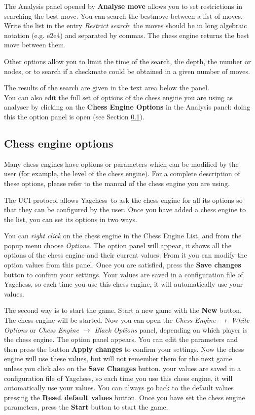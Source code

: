 \documentclass[a4paper]{article}
\newcommand{\nameprog}{Yagchess}
\begin{document}
The Analysis panel opened by \textbf{Analyse move} allows you to set restrictions in searching the best move. You can search the bestmove between a list of moves. Write the list
in the entry \textit{Restrict search}: the moves should be in long algebraic notation (e.g. e2e4) and separated by commas. The chess engine returns the best move
between them.

Other options allow you to limit the time of the search, the depth, the number or nodes, or to search if a checkmate could be obtained in a given number of moves.

The results of the search are given in the text area below the panel.\\

You can also edit the full set of options of the chess engine you are using as analyser by clicking on the \textbf{Chess Engine Options} in the Analysis panel: doing this
the option panel is open (see Section \ref{howce:opt}).


\subsection{Chess engine options}
\label{howce:opt}
Many chess engines have options or parameters which can be modified by the user (for example, the level of the chess engine). For a complete description of these options,
please refer to the manual of the chess engine you are using.

The UCI protocol allows \nameprog\ to ask the chess engine for all its options so that they can be configured by the user. Once you have added a chess engine to the list, 
you can set its options in two ways.

You can \textit{right click} on the chess engine in the Chess Engine List, and from the popup menu choose \textit{Options}. The option panel will appear, it shows all the options
of the chess engine and their current values. From it you can modify the option values from this panel. Once you are satisfied, press the \textbf{Save changes} button to confirm
your settings. Your values are saved in a configuration file of \nameprog, so each time you use this chess engine, it will automatically use your values.

The second way is to start the game. Start a new game with the \textbf{New} button. The chess engine will be started. Now you can open the
\textit{Chess Engine $\rightarrow$ White Options} or \textit{Chess Engine $\rightarrow$ Black Options} panel, depending on which player is the chess engine. The option panel appears.
You can edit the parameters and then press the button \textbf{Apply changes} to confirm your settings. Now the chess engine will use these values, but will not remember them
for the next game unless you click also on the \textbf{Save Changes} button. your values are saved in a configuration file of \nameprog, so each time you use this chess engine,
it will automatically use your values. You can always go back to the default values pressing the \textbf{Reset default values} button. Once you have set the chess engine
parameters, press the \textbf{Start} button to start the game.
\end{document}
